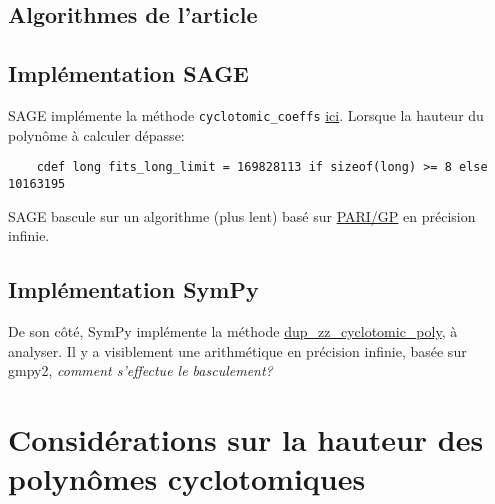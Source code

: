 \documentclass{article}
\theoremstyle{break}                  %
\begin{document}
\subsection*{Algorithmes de l'article}

\subsection*{Implémentation SAGE}
SAGE implémente la méthode  \texttt{cyclotomic\_coeffs} \href{https://github.com/sagemath/sage/blob/develop/src/sage/rings/polynomial/cyclotomic.pyx}{ici}. Lorsque la hauteur du polynôme à calculer dépasse:
\begin{verbatim}
	cdef long fits_long_limit = 169828113 if sizeof(long) >= 8 else 10163195
\end{verbatim}
SAGE bascule sur un algorithme (plus lent) basé sur \href{https://pari.math.u-bordeaux.fr/}{PARI/GP} en précision infinie.

\subsection*{Implémentation SymPy}
De son côté, SymPy implémente la méthode \href{https://docs.sympy.org/latest/modules/polys/internals.html#sympy.polys.factortools.dup_zz_cyclotomic_poly}{dup\_zz\_cyclotomic\_poly}, à analyser. Il y a visiblement une arithmétique en précision infinie, basée sur gmpy2, \textit{comment s'effectue le basculement?}

\section*{Considérations sur la hauteur des polynômes cyclotomiques}
\end{document}

